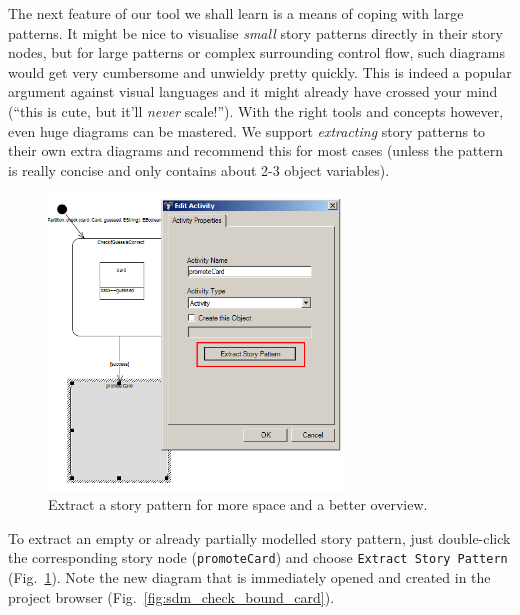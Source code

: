 The next feature of our tool we shall learn is a means of coping with large
patterns.  It might be nice to visualise \emph{small} story patterns directly in
their story nodes, but for large patterns or complex surrounding control flow,
such diagrams would get very cumbersome and unwieldy pretty quickly.  This is
indeed a popular argument against visual languages and it might already have
crossed your mind (``this is cute, but it'll \emph{never} scale!'').  With the
right tools and concepts however, even huge diagrams can be mastered.  We
support \emph{extracting} story patterns to their own extra diagrams and
recommend this for most cases (unless the pattern is really concise and
only contains about 2-3 object variables).  

\begin{figure}[htbp]
\begin{center}
  \includegraphics[width=0.7\textwidth]{pics/sdmBilder/check/sdm21}
  \caption{Extract a story pattern for more space and a better overview.}  
  \label{fig:sdm_check_extract_storypattern}
\end{center}
\end{figure}

To extract an empty or already
partially modelled story pattern, just double-click the corresponding story node
(\texttt{promoteCard}) and choose \texttt{Extract Story Pattern}
(Fig.~\ref{fig:sdm_check_extract_storypattern}). Note the new diagram that is
immediately opened and created in the project browser
(Fig.~\ref{fig:sdm_check_bound_card}).
\clearpage

